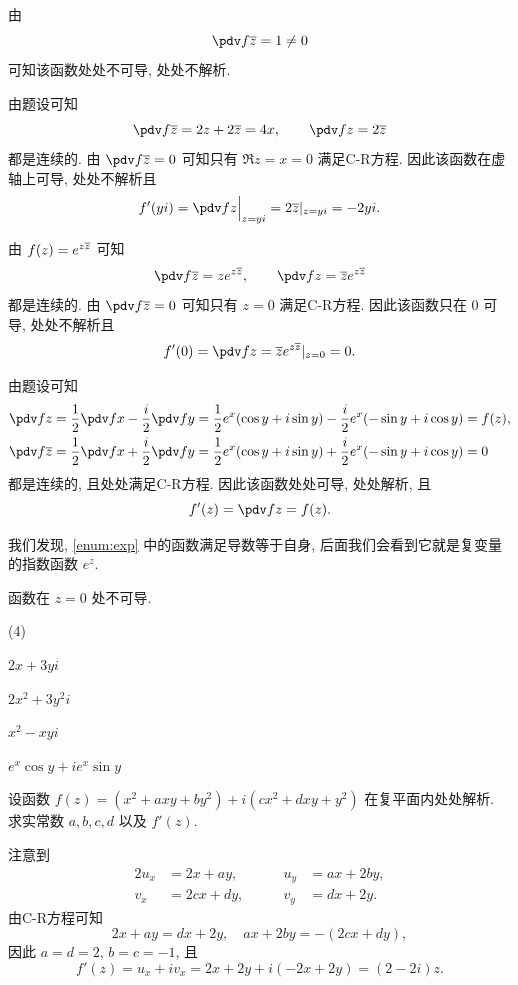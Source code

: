 \begin{solution}[另解]\delspace
  \begin{enumnopar}[(i)]
    \item 由
      \[
        \pdv f{\ov z}=1\neq0
      \]
      可知该函数处处不可导, 处处不解析.
    \item 由题设可知
      \[
        \pdv f{\ov z}=2z+2\ov z=4x,\qquad
        \pdv fz=2\ov z
      \]
      都是连续的.
      由 $\displaystyle\pdv f{\ov z}=0$ 可知只有 $\Re z=x=0$ 满足C-R方程.
      因此该函数在虚轴上可导, 处处不解析且
      \[
        f'(yi)=\pdv fz\Big|_{z=yi}=2\ov z|_{z=yi}=-2yi.
      \]
    \item 由 $f(z)=e^{z\overline z}$ 可知
      \[
        \pdv f{\ov z}=ze^{z\ov z},\qquad
        \pdv fz=\ov ze^{z\ov z}
      \]
      都是连续的.
      由 $\displaystyle\pdv f{\ov z}=0$ 可知只有 $z=0$ 满足C-R方程.
      因此该函数只在 $0$ 可导, 处处不解析且
      \[
        f'(0)=\pdv fz=\ov ze^{z\ov z}|_{z=0}=0.
      \]
    \item 由题设可知
      \[
        \begin{aligned}
          \pdv fz&
          =\frac12\pdv fx-\frac i2\pdv fy
          =\frac12e^x(\cos y+i\sin y)
          -\frac i2e^x(-\sin y+i\cos y)=f(z),\\
          \pdv f{\ov z}&
          =\frac12\pdv fx+\frac i2\pdv fy
          =\frac12e^x(\cos y+i\sin y)
          +\frac i2e^x(-\sin y+i\cos y)=0
        \end{aligned}
      \]
    都是连续的, 且处处满足C-R方程.
    因此该函数处处可导, 处处解析, 且
    \[
      f'(z)=\pdv fz=f(z).
    \]
  \end{enumnopar}
\end{solution}

我们发现, \ref{enum:exp} 中的函数满足导数等于自身, 后面我们会看到它就是复变量的指数函数 $e^z$.

\begin{exercise}
  函数\fillbrace{}在 $z=0$ 处不可导.
  \begin{exchoice}(4)
    \item $2x+3yi$
    \item $2x^2+3y^2i$
    \item $x^2-xyi$
    \item $e^x\cos y+i e^x\sin y$
  \end{exchoice}
\end{exercise}

\begin{example}
  设函数 $f(z)=(x^2+axy+by^2)+i(cx^2+dxy+y^2)$ 在复平面内处处解析. 求实常数 $a,b,c,d$ 以及 $f'(z)$.
\end{example}
\begin{solution}
  注意到
  \begin{alignat*}{2}
    u_x&=2x+ay,\qquad&u_y&=ax+2by,\\
    v_x&=2cx+dy,\qquad&v_y&=dx+2y.
  \end{alignat*}
  由C-R方程可知
    \[2x+ay=dx+2y,\quad ax+2by=-(2cx+dy),\]
  因此 $a=d=2$, $b=c=-1$, 且
    \[f'(z)=u_x+iv_x=2x+2y+i(-2x+2y)=(2-2i)z.\]
\end{solution}

